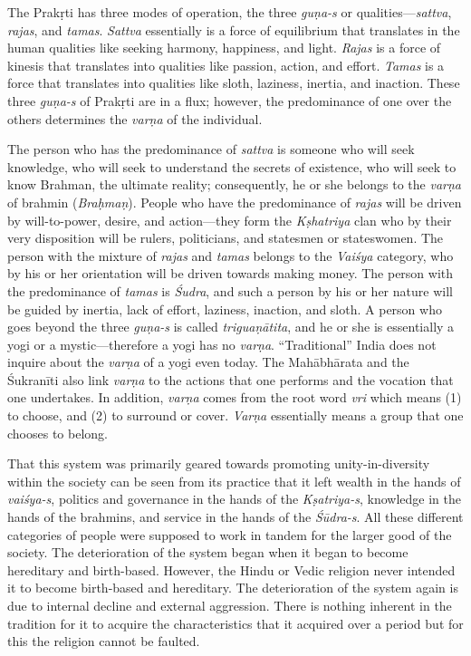 The Prakṛti  has three modes of operation, the three \textit{guṇa-s} or qualities—\textit{sattva},  \textit{rajas},   and \textit{tamas}. \textit{Sattva} essentially is a force of equilibrium that translates in the human qualities like seeking harmony, happiness, and light. \textit{Rajas} is a force of kinesis that translates into qualities like passion, action, and effort. \textit{Tamas} is a force that translates into qualities like sloth, laziness, inertia, and inaction. These three \textit{guṇa-s} of Prakṛti  are in a flux; however, the predominance of one over the others determines the \textit{varṇa} of the individual.


The person who has the predominance of \textit{sattva} is someone who will seek knowledge, who will seek to understand the secrets of existence, who will seek to know Brahman, the ultimate reality; consequently, he or she belongs to the \textit{varṇa} of brahmin (\textit{Braḥmaṇ}). People who have the predominance of \textit{rajas} will be driven by will-to-power, desire, and action—they form the \textit{Kṣhatriya} clan who by their very disposition will be rulers, politicians, and statesmen or stateswomen. The person with the mixture of \textit{rajas} and \textit{tamas} belongs to the \textit{Vaiśya} category, who by his or her orientation will be driven towards making money. The person with the predominance of \textit{tamas} is \textit{Śudra},  and such a person by his or her nature will be guided by inertia, lack of effort, laziness, inaction, and sloth. A person who goes beyond the three \textit{guṇa-s} is called \textit{triguaṇātita},  and he or she is essentially a yogi or a mystic—therefore a yogi has no \textit{varṇa}. “Traditional” India does not inquire about the \textit{varṇa} of a yogi even today. The Mahābhārata and the Śukranīti also link \textit{varṇa} to the actions that one performs and the vocation that one undertakes. In addition, \textit{varṇa} comes from the root word \textit{vri} which means (1) to choose, and (2) to surround or cover. \textit{Varṇa} essentially means a group that one chooses to belong.

That this system was primarily geared towards promoting unity-in-diversity within the society can be seen from its practice that it left wealth in the hands of \textit{vaiśya-s},  politics and governance in the hands of the \hbox{\textit{Kṣatriya-s}},  knowledge in the hands of the brahmins, and service in the hands of the \textit{Śūdra-s}. All these different categories of people were supposed to work in tandem for the larger good of the society. The deterioration of the system began when it began to become hereditary and birth-based. However, the Hindu or Vedic religion never intended it to become birth-based and hereditary. The deterioration of the system again is due to internal decline and external aggression. There is nothing inherent in the tradition for it to acquire the characteristics that it acquired over a period but for this the religion cannot be faulted.
\eject

